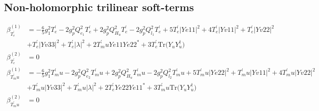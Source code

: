 \subsection{Non-holomorphic trilinear soft-terms}
{\allowdisplaybreaks  \begin{align} 
\beta_{T^{\prime}_e}^{(1)} & =  
-\frac{6}{5} g_{1}^{2} T^{\prime}_e -2 g_{p}^{2} Q_{e_{1}}^{2} T^{\prime}_e +2 g_{p}^{2} Q_{H_u}^{2} T^{\prime}_e -2 g_{p}^{2} Q_{l_1}^{2} T^{\prime}_e +5 T^{\prime}_e |Ye11|^2 +4 T^{\prime}_e |Yv11|^2 +T^{\prime}_e |Yv22|^2 \nonumber \\ 
 &+T^{\prime}_e |Yv33|^2 +T^{\prime}_e |\lambda|^2 +2 T^{\prime}_mu Ye11 Ye22^* +3 T^{\prime}_e \mbox{Tr}\Big({Y_u  Y_{u}^{\dagger}}\Big) \\ 
\beta_{T^{\prime}_e}^{(2)} & =  
0\\ 
\beta_{T^{\prime}_mu}^{(1)} & =  
-\frac{6}{5} g_{1}^{2} T^{\prime}_mu -2 g_{p}^{2} Q_{e_{2}}^{2} T^{\prime}_mu +2 g_{p}^{2} Q_{H_u}^{2} T^{\prime}_mu -2 g_{p}^{2} Q_{l_2}^{2} T^{\prime}_mu +5 T^{\prime}_mu |Ye22|^2 +T^{\prime}_mu |Yv11|^2 +4 T^{\prime}_mu |Yv22|^2 \nonumber \\ 
 &+T^{\prime}_mu |Yv33|^2 +T^{\prime}_mu |\lambda|^2 +2 T^{\prime}_e Ye22 Ye11^* +3 T^{\prime}_mu \mbox{Tr}\Big({Y_u  Y_{u}^{\dagger}}\Big) \\ 
\beta_{T^{\prime}_mu}^{(2)} & =  
0
\end{align}} 
